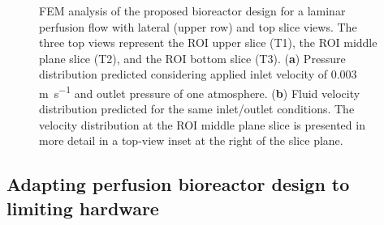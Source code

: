 \begin{figure}
\caption{\ac{FEM} analysis of the proposed bioreactor design for a laminar perfusion flow with lateral (upper row) and top slice views. The three top views represent the \ac{ROI} upper slice (T1), the \ac{ROI} middle plane slice (T2), and the ROI bottom slice (T3).  (\textbf{a}) Pressure distribution predicted considering applied inlet velocity of 0.003 \si{\meter\per\second} and outlet pressure of one atmosphere. (\textbf{b}) Fluid velocity distribution predicted for the same inlet/outlet conditions. The velocity distribution at the \ac{ROI} middle plane slice is presented in more detail in a top-view inset at the right of the slice plane.}
\label{figResultsA}
\end{figure}


\subsection{Adapting perfusion bioreactor design to limiting hardware}

